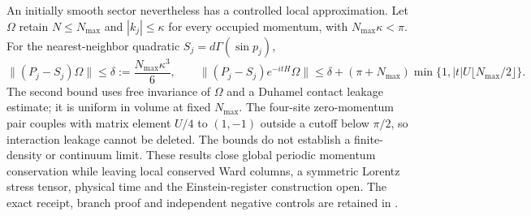 An initially smooth sector nevertheless has a controlled local
approximation.  Let $\Omega$ retain $N\leq N_{\max}$ and
$|k_j|\leq\kappa$ for every occupied momentum, with $N_{\max}\kappa<\pi$.
For the nearest-neighbor quadratic $S_j=d\Gamma(\sin p_j)$,
\[
 \|(P_j-S_j)\Omega\|\leq\delta:=\frac{N_{\max}\kappa^3}{6},\qquad
 \|(P_j-S_j)e^{-itH}\Omega\|
 \leq\delta+(\pi+N_{\max})
       \min\{1,|t|U\lfloor N_{\max}/2\rfloor\}.
\]
The second bound uses free invariance of $\Omega$ and a Duhamel contact
leakage estimate; it is uniform in volume at fixed $N_{\max}$.
The four-site zero-momentum pair couples with matrix element $U/4$ to
$(1,-1)$ outside a cutoff below $\pi/2$, so interaction leakage cannot be
deleted.  The bounds do not establish a finite-density or continuum limit.
These results close global periodic momentum conservation while leaving
local conserved Ward columns, a symmetric Lorentz stress tensor, physical
time and the Einstein-register construction open.  The exact receipt,
branch proof and independent negative controls are retained in
.
